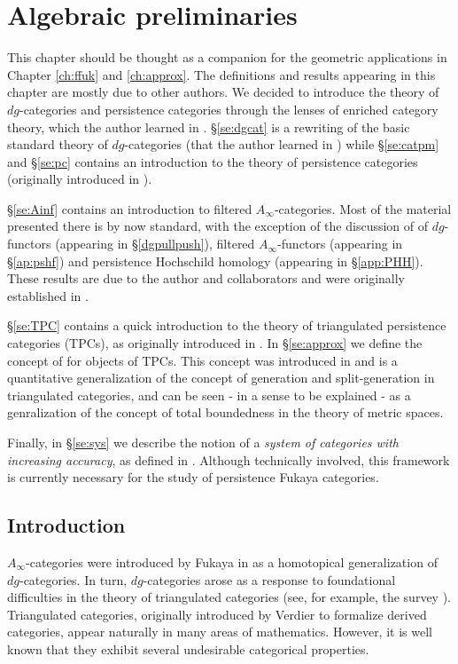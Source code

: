 \chapter{Algebraic preliminaries}\label{ch:prelim}
This chapter should be thought as a companion for the geometric applications in Chapter \ref{ch:ffuk} and \ref{ch:approx}. The definitions and results appearing in this chapter are mostly due to other authors. We decided to introduce the theory of $dg$-categories and persistence categories through the lenses of enriched category theory, which the author learned in \cite{Kelly2005Basic, Fong_Spivak_2019}. \S\ref{se:dgcat} is a rewriting of the basic standard theory of $dg$-categories (that the author learned in \cite{KellerICM,Se:book-fukaya-categ}) while \S\ref{se:catpm} and \S\ref{se:pc} contains an introduction to the theory of persistence categories (originally introduced in \cite{BCZ:tpc}).


\S\ref{se:Ainf} contains an introduction to filtered $A_\infty$-categories. Most of the material presented there is by now standard, with the exception of the discussion of of $dg$-functors (appearing in \S\ref{dgpullpush}), filtered $A_\infty$-functors (appearing in \S\ref{ap:pshf}) and persistence Hochschild homology (appearing in \S\ref{app:PHH}). These results are due to the author and collaborators and were originally established in \cite{ABC26}.

\S\ref{se:TPC} contains a quick introduction to the theory of triangulated persistence categories (TPCs), as originally introduced in \cite{BCZ:tpc}. In \S\ref{se:approx} we define the concept of  for objects of TPCs. This concept was introduced in \cite{ABC26} and is a quantitative generalization of the concept of generation and split-generation in triangulated categories, and can be seen - in a sense to be explained - as a genralization of the concept of total boundedness in the theory of metric spaces.

Finally, in \S\ref{se:sys} we describe the notion of a \emph{system of categories with increasing accuracy}, as defined in \cite{ABC26}. Although technically involved, this framework is currently necessary for the study of persistence Fukaya categories.

\section{Introduction}
$A_\infty$-categories were introduced by Fukaya in \cite{Fu:morse-homotopy-ai} as a homotopical generalization of $dg$-categories. In turn, $dg$-categories arose as a response to foundational difficulties in the theory of triangulated categories (see, for example, the survey \cite{KellerICM}). Triangulated categories, originally introduced by Verdier to formalize derived categories, appear naturally in many areas of mathematics. However, it is well known that they exhibit several undesirable categorical properties. 

